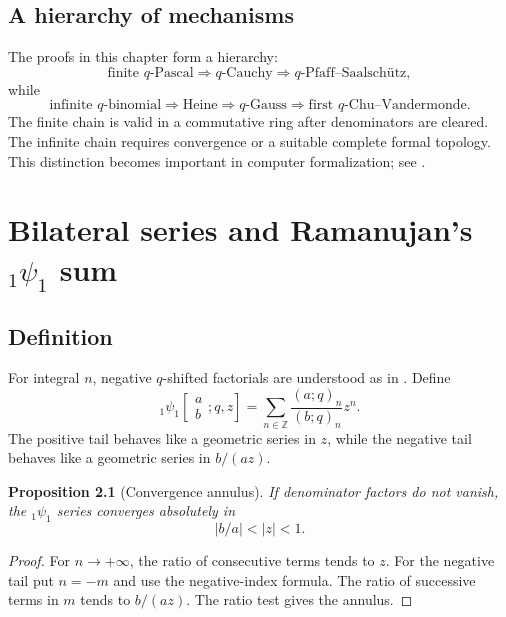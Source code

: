 \documentclass[11pt,oneside,openany]{book}
\newtheorem{proposition}[proposition]{Proposition}
\theoremstyle{definition}
\theoremstyle{remark}
\newcommand{\Z}{\mathbb Z}
\newcommand{\abs}[1]{\lvert #1\rvert}
\begin{document}
\section{A hierarchy of mechanisms}

The proofs in this chapter form a hierarchy:
\[
 \text{finite $q$-Pascal}
 \Longrightarrow \text{$q$-Cauchy}
 \Longrightarrow \text{$q$-Pfaff--Saalsch\"utz},
\]
while
\[
 \text{infinite $q$-binomial}
 \Longrightarrow \text{Heine}
 \Longrightarrow \text{$q$-Gauss}
 \Longrightarrow \text{first $q$-Chu--Vandermonde}.
\]
The finite chain is valid in a commutative ring after denominators are cleared.  The infinite chain requires convergence or a suitable complete formal topology.  This distinction becomes important in computer formalization; see .

\chapter{Bilateral series and Ramanujan's \texorpdfstring{${}_1\psi_1$}{1psi1} sum}\label{chap:bilateral}

\section{Definition}

For integral $n$, negative $q$-shifted factorials are understood as in .  Define
\[
 {}_1\psi_1\!\left[\begin{matrix}a\\b\end{matrix};q,z\right]
 =\sum_{n\in\Z}\frac{(a;q)_n}{(b;q)_n}z^n.
\]
The positive tail behaves like a geometric series in $z$, while the negative tail behaves like a geometric series in $b/(az)$.

\begin{proposition}[Convergence annulus]\label{prop:1psi1-convergence}
If denominator factors do not vanish, the ${}_1\psi_1$ series converges absolutely in
\[
 \abs{b/a}<\abs z<1.
\]
\end{proposition}

\begin{proof}
For $n\to+\infty$, the ratio of consecutive terms tends to $z$.  For the negative tail put $n=-m$ and use the negative-index formula.  The ratio of successive terms in $m$ tends to $b/(az)$.  The ratio test gives the annulus.
\end{proof}
\end{document}
